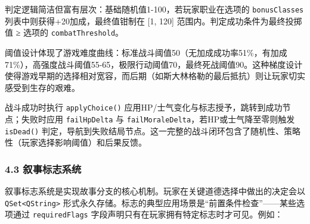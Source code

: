 \begin{Shaded}
\begin{Highlighting}[]
\OperatorTok{::}\OperatorTok{(} \OperatorTok{\textless{}}\OperatorTok{\textgreater{}} \OperatorTok{\&}\OperatorTok{)}  \OperatorTok{\{}
    \OperatorTok{=} \OperatorTok{(){-}\textgreater{}}\OperatorTok{(}\OperatorTok{,} \OperatorTok{);} \CommentTok{// [1, 100]}
     \OperatorTok{(}\OperatorTok{(}\OperatorTok{))}
\OperatorTok{+=} \OperatorTok{;}                       
     \OperatorTok{(}\OperatorTok{,}\OperatorTok{,} \OperatorTok{);}          
\OperatorTok{\}}
\end{Highlighting}
\end{Shaded}

判定逻辑简洁但富有层次：基础随机值1-100，若玩家职业在选项的
\texttt{bonusClasses} 列表中则获得+20加成，最终值钳制在 {[}1, 120{]}
范围内。判定成功条件为最终投掷值 ≥ 选项的 \texttt{combatThreshold}。

阈值设计体现了游戏难度曲线：标准战斗阈值50（无加成成功率51\%，有加成71\%），高强度战斗阈值55-65，极限行动阈值70，最终死战阈值90。这种梯度设计使得游戏早期的选择相对宽容，而后期（如斯大林格勒的最后抵抗）则让玩家切实感受到生存的艰难。

战斗成功时执行 \texttt{applyChoice()}
应用HP/士气变化与标志授予，跳转到成功节点；失败时应用
\texttt{failHpDelta} 与 \texttt{failMoraleDelta}，若HP或士气降至零则触发
\texttt{isDead()}
判定，导航到失败结局节点。这一完整的战斗闭环包含了随机性、策略性（玩家选择影响阈值）和后果反馈。

\hypertarget{ux53d9ux4e8bux6807ux5fd7ux7cfbux7edf}{%
\subsubsection{4.3
叙事标志系统}\label{ux53d9ux4e8bux6807ux5fd7ux7cfbux7edf}}

叙事标志系统是实现故事分支的核心机制。玩家在关键道德选择中做出的决定会以
\texttt{QSet\textless{}QString\textgreater{}}
形式永久存储。标志的典型应用场景是``前置条件检查''------某些选项通过
\texttt{requiredFlags} 字段声明只有在玩家拥有特定标志时才可见。例如：

